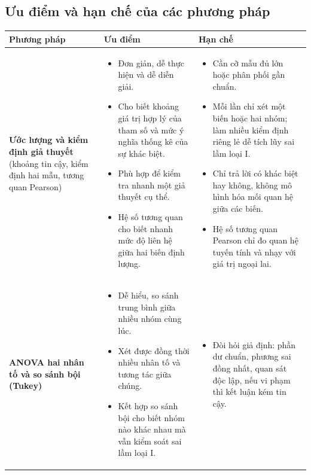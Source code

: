 \subsection{Ưu điểm và hạn chế của các phương pháp}
\begin{table}[H]
\centering
\setlength{\tabcolsep}{5pt}
\renewcommand{\arraystretch}{1.25}
\begin{tabular}{|p{2.8cm}|p{6.4cm}|p{6.4cm}|}
\hline
\textbf{Phương pháp} & \textbf{Ưu điểm} & \textbf{Hạn chế} \tabularnewline \hline
\raggedright\textbf{Ước lượng và kiểm định giả thuyết} \newline (khoảng tin cậy, kiểm định hai mẫu, tương quan Pearson) &
\raggedright\begin{itemize}[nosep,leftmargin=*]
    \item Đơn giản, dễ thực hiện và dễ diễn giải.
    \item Cho biết khoảng giá trị hợp lý của tham số và mức ý nghĩa thống kê của sự khác biệt.
    \item Phù hợp để kiểm tra nhanh một giả thuyết cụ thể.
    \item Hệ số tương quan cho biết nhanh mức độ liên hệ giữa hai biến định lượng.
\end{itemize} &
\raggedright\begin{itemize}[nosep,leftmargin=*]
    \item Cần cỡ mẫu đủ lớn hoặc phân phối gần chuẩn.
    \item Mỗi lần chỉ xét một biến hoặc hai nhóm; làm nhiều kiểm định riêng lẻ dễ tích lũy sai lầm loại I.
    \item Chỉ trả lời có khác biệt hay không, không mô hình hóa mối quan hệ giữa các biến.
    \item Hệ số tương quan Pearson chỉ đo quan hệ tuyến tính và nhạy với giá trị ngoại lai.
\end{itemize} \tabularnewline \hline
\raggedright\textbf{ANOVA hai nhân tố và so sánh bội (Tukey)} &
\raggedright\begin{itemize}[nosep,leftmargin=*]
    \item Dễ hiểu, so sánh trung bình giữa nhiều nhóm cùng lúc.
    \item Xét được đồng thời nhiều nhân tố và tương tác giữa chúng.
    \item Kết hợp so sánh bội cho biết nhóm nào khác nhau mà vẫn kiểm soát sai lầm loại I.
\end{itemize} &
\raggedright\begin{itemize}[nosep,leftmargin=*]
    \item Đòi hỏi giả định: phần dư chuẩn, phương sai đồng nhất, quan sát độc lập, nếu vi phạm thì kết luận kém tin cậy.

\end{itemize}
\end{tabular}
\end{table}
